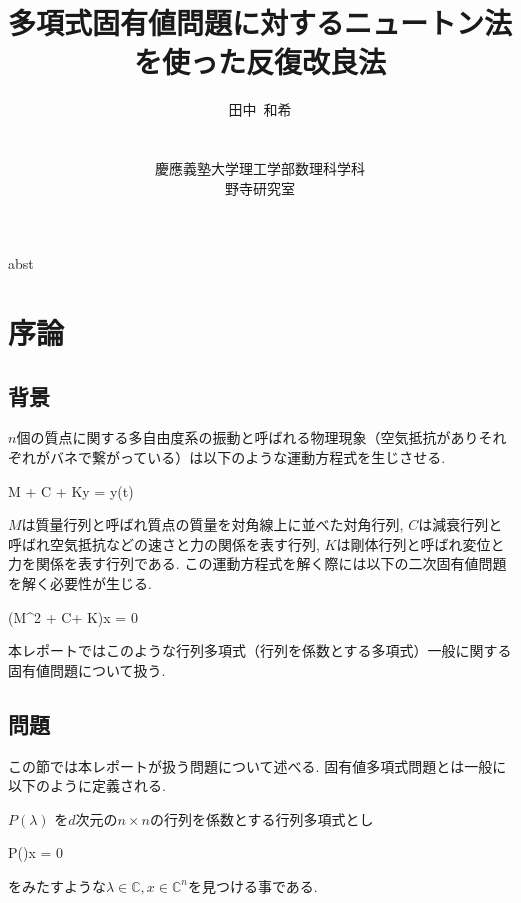 \documentclass[a4paper,12pt]{nodlabpabw}
\newenvironment{Eqnarray*}%
{\arraycolsep 0.14em\begin{eqnarray*}}{\end{eqnarray*}}
\begin{document}
\title{多項式固有値問題に対するニュートン法を使った反復改良法}
\author{田中\ 和希\\\\\\慶應義塾大学理工学部数理科学科\\野寺研究室}
\date{}
\maketitle
\begin{tableofcontents}
\end{tableofcontents}
\abstract
abst
\endabstract
%
\chapter{序論}
\section{背景}\label{chapint}
$n$個の質点に関する多自由度系の振動と呼ばれる物理現象（空気抵抗がありそれぞれがバネで繋がっている）は以下のような運動方程式を生じさせる.

\begin{Eqnarray*}
M + C + Ky = y(t)
\end{Eqnarray*}


$M$は質量行列と呼ばれ質点の質量を対角線上に並べた対角行列, $C$は減衰行列と呼ばれ空気抵抗などの速さと力の関係を表す行列, $K$は剛体行列と呼ばれ変位と力を関係を表す行列である. この運動方程式を解く際には以下の二次固有値問題を解く必要性が生じる.

\begin{Eqnarray*}
(M\lambda^2 + C\lambda + K)x = 0
\end{Eqnarray*}

本レポートではこのような行列多項式（行列を係数とする多項式）一般に関する固有値問題について扱う.

\section{問題}\label{chapint}

この節では本レポートが扱う問題について述べる. 固有値多項式問題とは一般に以下のように定義される.

$P(\lambda)$ を$d$次元の$n\times n$の行列を係数とする行列多項式とし

\begin{Eqnarray*}
P(\lambda)x = 0
\end{Eqnarray*}
をみたすような$\lambda\in\mathbb{C}, x\in\mathbb{C}^n$を見つける事である.
\end{document}
